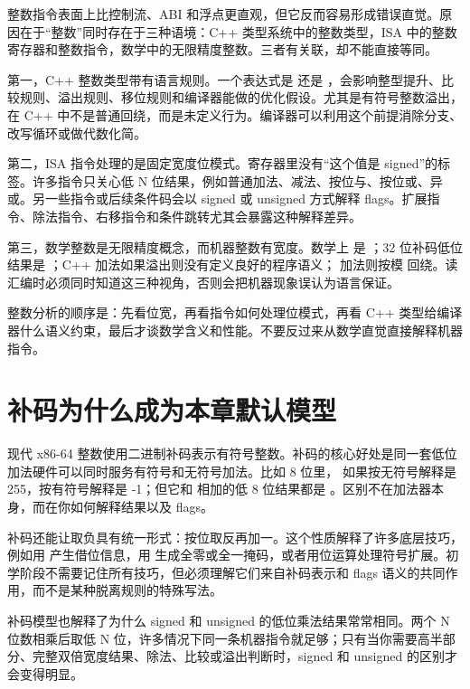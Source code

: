 整数指令表面上比控制流、ABI 和浮点更直观，但它反而容易形成错误直觉。原因在于“整数”同时存在于三种语境：C++ 类型系统中的整数类型，ISA 中的整数寄存器和整数指令，数学中的无限精度整数。三者有关联，却不能直接等同。

第一，C++ 整数类型带有语言规则。一个表达式是  还是 ，会影响整型提升、比较规则、溢出规则、移位规则和编译器能做的优化假设。尤其是有符号整数溢出，在 C++ 中不是普通回绕，而是未定义行为。编译器可以利用这个前提消除分支、改写循环或做代数化简。

第二，ISA 指令处理的是固定宽度位模式。寄存器里没有“这个值是 signed”的标签。许多指令只关心低 N 位结果，例如普通加法、减法、按位与、按位或、异或。另一些指令或后续条件码会以 signed 或 unsigned 方式解释 flags。扩展指令、除法指令、右移指令和条件跳转尤其会暴露这种解释差异。

第三，数学整数是无限精度概念，而机器整数有宽度。数学上  是 ；32 位补码低位结果是 ；C++  加法如果溢出则没有定义良好的程序语义； 加法则按模  回绕。读汇编时必须同时知道这三种视角，否则会把机器现象误认为语言保证。

\begin{mentalmodel}
整数分析的顺序是：先看位宽，再看指令如何处理位模式，再看 C++ 类型给编译器什么语义约束，最后才谈数学含义和性能。不要反过来从数学直觉直接解释机器指令。
\end{mentalmodel}

\section{补码为什么成为本章默认模型}

现代 x86-64 整数使用二进制补码表示有符号整数。补码的核心好处是同一套低位加法硬件可以同时服务有符号和无符号加法。比如 8 位里， 如果按无符号解释是 255，按有符号解释是 -1；但它和  相加的低 8 位结果都是 。区别不在加法器本身，而在你如何解释结果以及 flags。

补码还能让取负具有统一形式：按位取反再加一。这个性质解释了许多底层技巧，例如用  产生借位信息，用  生成全零或全一掩码，或者用位运算处理符号扩展。初学阶段不需要记住所有技巧，但必须理解它们来自补码表示和 flags 语义的共同作用，而不是某种脱离规则的特殊写法。

补码模型也解释了为什么 signed 和 unsigned 的低位乘法结果常常相同。两个 N 位数相乘后取低 N 位，许多情况下同一条机器指令就足够；只有当你需要高半部分、完整双倍宽度结果、除法、比较或溢出判断时，signed 和 unsigned 的区别才会变得明显。


